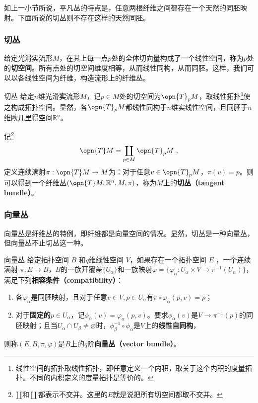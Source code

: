 如上一小节所说，平凡丛的特点是，任意两根纤维之间都存在一个天然的同胚映射。下面所说的切丛则不存在这样的天然同胚。


\subsubsection{切丛}



给定光滑实流形$M$，在其上每一点$p$处的全体切向量构成了一个线性空间，称为$p$处的\textbf{切空间}。所有点处的切空间维度相等，从而线性同构，从而同胚。这样，我们可以以各线性空间为纤维，构造流形上的纤维丛。


\begin{definition}{切丛}
给定$n$维光滑\textbf{实}流形$M$，记$p\in M$处的切空间为$\opn{T}_p M$，取线性拓扑\footnote{线性空间的拓扑取线性拓扑，即任意定义一个内积，取关于这个内积的度量拓扑。不同的内积定义的度量拓扑是等价的。}使之构成拓扑空间。显然，各$\opn{T}_pM$都线性同构于$n$维实线性空间，且同胚于$n$维欧几里得空间$\mathbb{R}^n$。

记\footnote{$\amalg$和$\coprod$都表示不交并。这里的$E$就是说把所有切空间都取不交并。}
\begin{equation}
\opn{T}M= \coprod_{p\in M}\opn{T}_p M~, 
\end{equation}
定义连续满射$\pi:\opn{T}M\to M$为：对于任意$v\in \opn{T}_p M$，$\pi(v)=p$。则可以得到一个纤维丛$(\opn{T}M, \mathbb{R}^n, M, \pi)$，称为$M$上的\textbf{切丛（tangent bundle）}。

\end{definition}





\subsubsection{向量丛}



向量丛是纤维丛的特例，即纤维都是向量空间的情况。显然，切丛是一种向量丛，但向量丛不止切丛这一种。

\begin{definition}{向量丛}\label{def_Fibre_1}
给定拓扑空间 $B$ 和$q$维线性空间 $V$，如果存在一个拓扑空间 $E$ ，一个连续满射 $\pi:E\rightarrow B$，$B$的一族开覆盖$\{U_\alpha\}$和一族映射$\varphi=\{\varphi_\alpha: U_\alpha\times V\to \pi^{-1}(U_\alpha)\}$，满足下列\textbf{相容条件（compatibility）}：
\begin{enumerate}
\item 各$\varphi_\alpha$是同胚映射，且对于任意$v\in V, p\in U_\alpha$有$\pi\circ\varphi_\alpha(p, v)=p$；
\item 对于\textbf{固定的}$p\in U_\alpha$，记$\phi_\alpha(v)=\varphi_\alpha(p, v)$。要求$\phi_\alpha(v)$是$V\to \pi^{-1}(p)$的同胚映射；且当$U_\alpha\cap U_\beta\not=\varnothing$时，$\phi_\beta^{-1}\circ\phi_\alpha$是$V$上的\textbf{线性自同构}，
\end{enumerate}
则称$(E, B, \pi, \varphi)$是$B$上的$q$阶\textbf{向量丛（vector bundle）}。

\end{definition}






